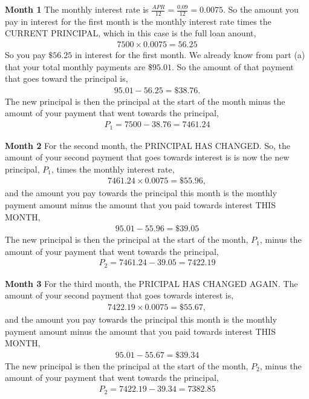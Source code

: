 \documentclass[12pt]{article}
\begin{document}
\begin{enumerate}
{{\bf Month 1}
The monthly interest rate is $\frac{APR}{12}=\frac{0.09}{12} = 0.0075$.  So the amount you pay in interest for the first month is the monthly interest rate times the CURRENT PRINCIPAL, which in this case is the full loan anount,
\begin{eqnarray*}
	7500 \times 0.0075 = 56.25
\end{eqnarray*}
So you pay $\$56.25$ in interest for the first month.  We already know from part (a) that your total monthly payments are $\$95.01$.  So the amount of that payment that goes toward the principal is,
\begin{eqnarray*}
	95.01 - 56.25 = \$38.76.
\end{eqnarray*}
The new principal is then the principal at the start of the month minus the amount of your payment that went towards the principal,
\begin{eqnarray*}
	P_1 = 7500 - 38.76 = 7461.24
\end{eqnarray*}

{\bf Month 2}
For the second month, the PRINCIPAL HAS CHANGED.  So, the amount of your second payment that goes towards interest is is now the new principal, $P_1$, times the monthly interest rate,
\begin{eqnarray*}
	7461.24 \times 0.0075 = \$55.96,
\end{eqnarray*}
and the amount you pay towards the principal this month is the monthly payment amount minus the amount that you paid towards interest THIS MONTH,
\begin{eqnarray*}
	95.01 - 55.96 = \$39.05
\end{eqnarray*}
The new principal is then the principal at the start of the month, $P_1$, minus the amount of your payment that went towards the principal,
\begin{eqnarray*}
	P_2 = 7461.24 - 39.05 = 7422.19
\end{eqnarray*}

{\bf Month 3}
For the third month, the PRICIPAL HAS CHANGED AGAIN.  The amount of your second payment that goes towards interest is,
\begin{eqnarray*}
	7422.19 \times 0.0075 = \$55.67,
\end{eqnarray*}
and the amount you pay towards the principal this month is the monthly payment amount minus the amount that you paid towards interest THIS MONTH,
\begin{eqnarray*}
	95.01 - 55.67 = \$39.34
\end{eqnarray*}
The new principal is then the principal at the start of the month, $P_2$, minus the amount of your payment that went towards the principal,
\begin{eqnarray*}
	P_2 = 7422.19 - 39.34 = 7382.85
\end{eqnarray*}
}
\end{enumerate}
\end{document}
